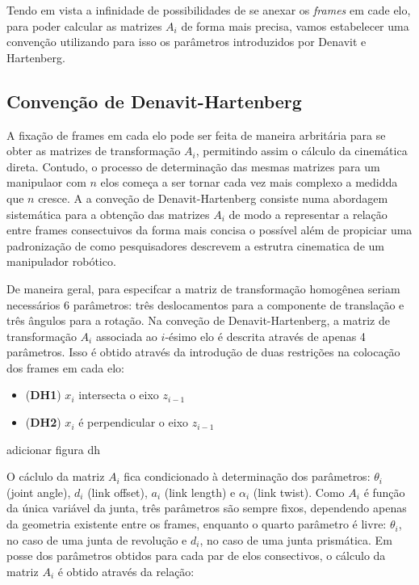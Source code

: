 Tendo em vista a infinidade de possibilidades de se anexar os \emph{frames} em cade elo, para poder calcular as matrizes $A_i$ de forma mais precisa, vamos estabelecer uma convenção utilizando para isso os parâmetros introduzidos por Denavit e Hartenberg.

\subsection{Convenção de Denavit-Hartenberg}

A fixação de frames em cada elo pode ser feita de maneira arbritária para se obter as matrizes de transformação $A_i$, permitindo assim o cálculo da cinemática direta. Contudo, o processo de determinação das mesmas matrizes para um manipulaor com $n$ elos começa a ser tornar cada vez mais complexo a medidda que $n$ cresce. A a conveção de Denavit-Hartenberg consiste numa abordagem sistemática para a obtenção das matrizes $A_i$ de modo a representar a relação entre frames consectuivos da forma mais concisa o possível além de propiciar uma padronização de como pesquisadores descrevem a estrutra cinematica de um manipulador robótico.

De maneira geral, para especifcar a matriz de transformação homogênea seriam necessários 6 parâmetros: três deslocamentos para a componente de translação e três ângulos para a rotação. Na conveção de Denavit-Hartenberg, a matriz de transformação $A_i$ associada ao $i$-ésimo elo é descrita através de apenas 4 parâmetros. Isso é obtido através da introdução de duas restrições na colocação dos frames em cada elo: 

\begin{itemize}
    \item (\textbf{DH1}) $x_i$ intersecta o eixo $z_{i-1}$
    \item (\textbf{DH2}) $x_i$ é perpendicular o eixo $z_{i-1}$
\end{itemize}

adicionar figura dh

O cáclulo da matriz $A_i$ fica condicionado à determinação dos parâmetros: $\theta_i$ (joint angle), $d_i$ (link offset), $a_i$ (link length) e $\alpha_i$ (link twist). Como $A_i$ é função da única variável da junta, três parâmetros são sempre fixos, dependendo apenas da geometria existente entre os frames, enquanto o quarto parâmetro é livre: $\theta_i$, no caso de uma junta de revolução e $d_i$, no caso de uma junta prismática. Em posse dos parâmetros obtidos para cada par de elos consectivos, o cálculo da matriz $A_i$ é obtido através da relação:

